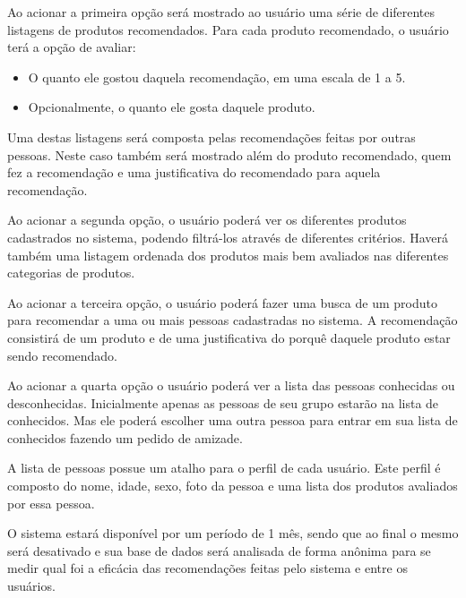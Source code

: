  Ao acionar a primeira opção será mostrado ao usuário uma série de diferentes listagens de produtos recomendados. Para cada produto recomendado, o usuário terá a opção de avaliar:

\begin{itemize}
	\item O quanto ele gostou daquela recomendação, em uma escala de 1 a 5.
	\item Opcionalmente, o quanto ele gosta daquele produto.
\end{itemize}

 Uma destas listagens será composta pelas recomendações feitas por outras pessoas. Neste caso também será mostrado além do produto recomendado, quem fez a recomendação e uma justificativa do recomendado para aquela recomendação.

 Ao acionar a segunda opção, o usuário poderá ver os diferentes produtos cadastrados no sistema, podendo filtrá-los através de diferentes critérios. Haverá também uma listagem ordenada dos produtos mais bem avaliados nas diferentes categorias de produtos.

 Ao acionar a terceira opção, o usuário poderá fazer uma busca de um produto para recomendar a uma ou mais pessoas cadastradas no sistema. A recomendação consistirá de um produto e de uma justificativa do porquê daquele produto estar sendo recomendado.

 Ao acionar a quarta opção o usuário poderá ver a lista das pessoas conhecidas ou desconhecidas. Inicialmente apenas as pessoas de seu grupo estarão na lista de conhecidos. Mas ele poderá escolher uma outra pessoa para entrar em sua lista de conhecidos fazendo um pedido de amizade.

 A lista de pessoas possue um atalho para o perfil de cada usuário. Este perfil é composto do nome, idade, sexo, foto da pessoa e uma lista dos produtos avaliados por essa pessoa.

 O sistema estará disponível por um período de 1 mês, sendo que ao final o mesmo será desativado e sua base de dados será analisada de forma anônima para se medir qual foi a eficácia das recomendações feitas pelo sistema e entre os usuários.


